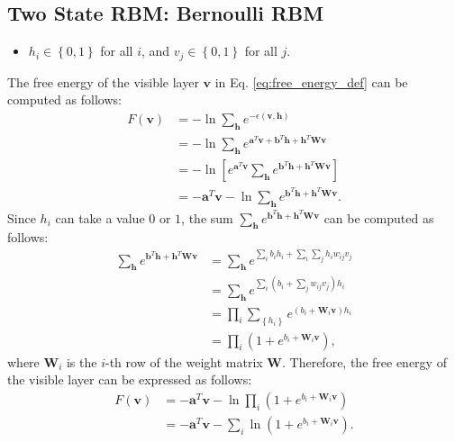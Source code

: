 \documentclass[10pt, a4paper]{article}
\begin{document}
\subsection{Two State RBM: Bernoulli RBM}
\begin{itemize}
  \item $h_i\in \left\{0,1\right\}$ for all $i$, and $v_j\in \left\{0,1\right\}$ for all $j$.
\end{itemize}
The free energy of the visible layer $\mathbf{v}$ in Eq. \eqref{eq:free_energy_def} can be computed as follows:
\begin{align}
  F(\mathbf{v}) &=-\ln \sum_{\mathbf{h}} e^{-\epsilon(\mathbf{v}, \mathbf{h})} \nonumber \\
  &=-\ln \sum_{\mathbf{h}} e^{\mathbf{a}^T \mathbf{v} + \mathbf{b}^T \mathbf{h}
    + \mathbf{h}^T \mathbf{W} \mathbf{v}} \nonumber \\
  &=-\ln \left[e^{\mathbf{a}^T \mathbf{v}} \sum_{\mathbf{h}} e^{\mathbf{b}^T \mathbf{h} 
    + \mathbf{h}^T \mathbf{W} \mathbf{v}}\right] \nonumber \\
  &=-\mathbf{a}^T \mathbf{v} - \ln \sum_{\mathbf{h}} e^{\mathbf{b}^T \mathbf{h} 
    + \mathbf{h}^T \mathbf{W} \mathbf{v}}. 
  \label{eq:free_energy_bernoulli}
\end{align}
Since $h_i$ can take a value $0$ or $1$, 
the sum $\sum_{\mathbf{h}} e^{\mathbf{b}^T \mathbf{h} + \mathbf{h}^T \mathbf{W} \mathbf{v}}$ 
can be computed as follows:
\begin{align}
  \sum_{\mathbf{h}} e^{\mathbf{b}^T \mathbf{h} + \mathbf{h}^T \mathbf{W} \mathbf{v}}
    &=\sum_{\mathbf{h}} e^{\sum_i b_i h_i + \sum_i\sum_j h_i w_{ij} v_j} \nonumber \\
    &=\sum_{\mathbf{h}} e^{\sum_i (b_i + \sum_{j} w_{ij} v_j)h_i} \nonumber \\
    &=\prod_{i} \sum_{\left\{h_i\right\}} e^{(b_i + \mathbf{W}_{i} \mathbf{v})h_i } \nonumber \\
  &= \prod_{i} \left(1 + e^{b_i +  \mathbf{W}_{i} \mathbf{v}}\right),
\end{align}
where $\mathbf{W}_i$ is the $i$-th row of the weight matrix $\mathbf{W}$.
Therefore, the free energy of the visible layer can be expressed as follows:
\begin{align}
  F(\mathbf{v}) &=-\mathbf{a}^T \mathbf{v} - \ln \prod_{i} \left(1 + e^{b_i +  \mathbf{W}_{i} \mathbf{v}}\right) \nonumber \\
  &=-\mathbf{a}^T \mathbf{v} - \sum_i \ln \left(1 + e^{b_i +  \mathbf{W}_{i} \mathbf{v}}\right).
  \label{eq:free_energy_bernoulli_final}
\end{align}
\end{document}

